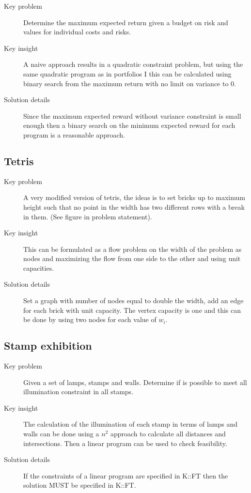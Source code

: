 \documentclass[11pt]{book}
\begin{document}
\begin{description}
	\item[Key problem] Determine the maximum expected return given a budget on risk and values for individual costs and risks.
	\item[Key insight] A naive approach results in a quadratic constraint problem, but using the same quadratic program as in portfolios I this can be calculated using binary search from the maximum return with no limit on variance to 0.
	\item[Solution details] Since the maximum expected reward without variance constraint is small enough then a binary search on the minimum expected reward for each program is a reasonable approach.
\end{description}

\subsection{Tetris}

\begin{description}
	\item[Key problem] A very modified version of tetris, the ideas is to set bricks up to maximum height such that no point in the width has two different rows with a break in them. (See figure in problem statement).
	\item[Key insight] This can be formulated as a flow problem on the width of the problem as nodes and maximizing the flow from one side to the other and using unit capacities.
	\item[Solution details] Set a graph with number of nodes equal to double the width, add an edge for each brick with unit capacity. The vertex capacity is one and this can be done by using two nodes for each value of $w_i$.
\end{description}

\subsection{Stamp exhibition}

\begin{description}
	\item[Key problem] Given a set of lamps, stamps and walls. Determine if is possible to meet all illumination constraint in all stamps.
	\item[Key insight] The calculation of the illumination of each stamp in terms of lamps and walls can be done using a $n^2$ approach to calculate all distances and intersections. Then a linear program can be used to check feasibility.
	\item[Solution details] If the constraints of a linear program are specified in K::FT then the solution MUST be specified in K::FT.
\end{description}
\end{document}
